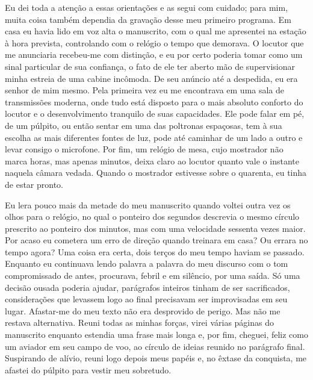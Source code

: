 Eu dei toda a atenção a essas orientações e as segui com cuidado; para
mim, muita coisa também dependia da gravação desse meu primeiro
programa. Em casa eu havia lido em voz alta o manuscrito, com o qual me
apresentei na estação à hora prevista, controlando com o relógio o tempo
que demorava. O locutor que me anunciaria recebeu-me com distinção, e eu
por certo poderia tomar como um sinal particular de sua confiança, o
fato de ele ter aberto mão de supervisionar minha estreia de uma cabine
incômoda. De seu anúncio até a despedida, eu era senhor de mim mesmo.
Pela primeira vez eu me encontrava em uma sala de transmissões moderna,
onde tudo está disposto para o mais absoluto conforto do locutor e o
desenvolvimento tranquilo de suas capacidades. Ele pode falar em pé, de
um púlpito, ou então sentar em uma das poltronas espaçosas, tem à sua
escolha as mais diferentes fontes de luz, pode até caminhar de um lado a
outro e levar consigo o microfone. Por fim, um relógio de mesa, cujo
mostrador não marca horas, mas apenas minutos, deixa claro ao locutor
quanto vale o instante naquela câmara vedada. Quando o mostrador
estivesse sobre o quarenta, eu tinha de estar pronto.

Eu lera pouco mais da metade do meu manuscrito quando voltei outra vez
os olhos para o relógio, no qual o ponteiro dos segundos descrevia o
mesmo círculo prescrito ao ponteiro dos minutos, mas com uma velocidade
sessenta vezes maior. Por acaso eu cometera um erro de direção quando
treinara em casa? Ou errara no tempo agora? Uma coisa era certa, dois
terços do meu tempo haviam se passado. Enquanto eu continuava lendo
palavra a palavra do meu discurso com o tom compromissado de antes,
procurava, febril e em silêncio, por uma saída. Só uma decisão ousada
poderia ajudar, parágrafos inteiros tinham de ser sacrificados,
considerações que levassem logo ao final precisavam ser improvisadas em
seu lugar. Afastar-me do meu texto não era desprovido de perigo. Mas não
me restava alternativa. Reuni todas as minhas forças, virei várias
páginas do manuscrito enquanto estendia uma frase mais longa e, por fim,
cheguei, feliz como um aviador em seu campo de voo, ao círculo de ideias
reunido no parágrafo final. Suspirando de alívio, reuni logo depois meus
papéis e, no êxtase da conquista, me afastei do púlpito para vestir meu
sobretudo.

